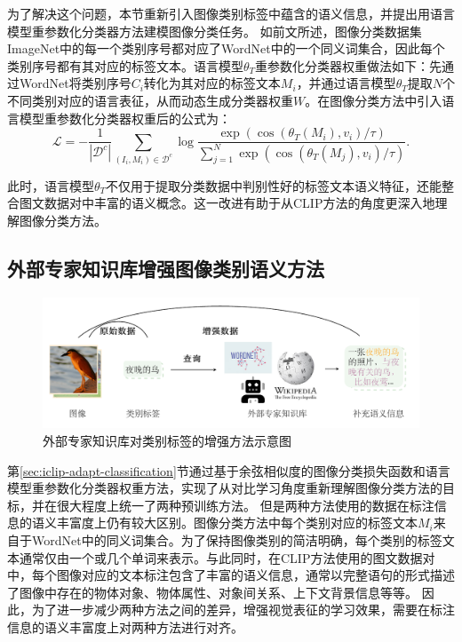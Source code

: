 为了解决这个问题，本节重新引入图像类别标签中蕴含的语义信息，并提出用语言模型重参数化分类器方法建模图像分类任务。
如前文所述，图像分类数据集ImageNet中的每一个类别序号都对应了WordNet中的一个同义词集合，因此每个类别序号都有其对应的标签文本。语言模型$\theta_{T}$重参数化分类器权重做法如下：先通过WordNet将类别序号$C_{i}$转化为其对应的标签文本$M_{i}$，并通过语言模型$\theta_{T}$提取$N$个不同类别对应的语言表征，从而动态生成分类器权重$W$。在图像分类方法中引入语言模型重参数化分类器权重后的公式为：
\begin{equation}
    \mathcal{L}=-\frac{1}{\left|\mathcal{D}^{c}\right|} \sum_{\left(I_{i}, M_{i}\right) \in \mathcal{D}^{c}} \log \frac{\exp \left(\cos \left(\theta_{T}\left(M_{i}\right), v_{i}\right) / \tau\right)}{\sum_{j=1}^{N} \exp \left(\cos \left(\theta_{T}\left(M_{j}\right), v_{i}\right) / \tau\right)}.
    \label{eq:iclip-wo-dictionary}
\end{equation}

此时，语言模型$\theta_{T}$不仅用于提取分类数据中判别性好的标签文本语义特征，还能整合图文数据对中丰富的语义概念。这一改进有助于从CLIP方法的角度更深入地理解图像分类方法。

\subsection{外部专家知识库增强图像类别语义方法} 
\label{sec:iclip-adapt-external}
\begin{figure}
  \centering
  \includegraphics[width=1.0\linewidth]{figures/iclip-knowledge.pdf}
  \caption{外部专家知识库对类别标签的增强方法示意图}
  \label{fig:iclip-knowledge}
\end{figure}
第\ref{sec:iclip-adapt-classification}节通过基于余弦相似度的图像分类损失函数和语言模型重参数化分类器权重方法，实现了从对比学习角度重新理解图像分类方法的目标，并在很大程度上统一了两种预训练方法。
但是两种方法使用的数据在标注信息的语义丰富度上仍有较大区别。图像分类方法中每个类别对应的标签文本$M_i$来自于WordNet中的同义词集合。为了保持图像类别的简洁明确，每个类别的标签文本通常仅由一个或几个单词来表示。与此同时，在CLIP方法使用的图文数据对中，每个图像对应的文本标注包含了丰富的语义信息，通常以完整语句的形式描述了图像中存在的物体对象、物体属性、对象间关系、上下文背景信息等等。
因此，为了进一步减少两种方法之间的差异，增强视觉表征的学习效果，需要在标注信息的语义丰富度上对两种方法进行对齐。

